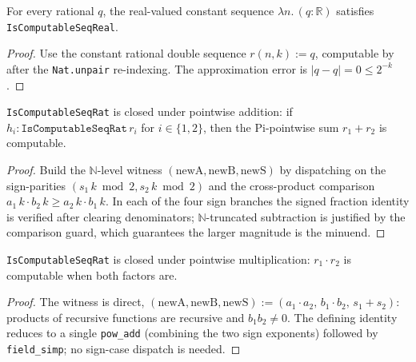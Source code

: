 \begin{lemma}
  \label{lem:l1_isComputableSeqReal_const_rat}
  \leanok
  For every rational $q$, the real-valued constant sequence $\lambda n.\,(q : \mathbb{R})$ satisfies \texttt{IsComputableSeqReal}.
\end{lemma}
\begin{proof}\leanok
  Use the constant rational double sequence $r(n,k) := q$, computable by  after the \texttt{Nat.unpair} re-indexing. The approximation error is $|q - q| = 0 \le 2^{-k}$.
\end{proof}

\begin{lemma}
  \label{lem:l1_isComputableSeqRat_add}
  \leanok
  \texttt{IsComputableSeqRat} is closed under pointwise addition: if $h_i : \texttt{IsComputableSeqRat}\,r_i$ for $i \in \{1,2\}$, then the Pi-pointwise sum $r_1 + r_2$ is computable.
\end{lemma}
\begin{proof}\leanok
  Build the $\mathbb{N}$-level witness $(\mathrm{newA}, \mathrm{newB}, \mathrm{newS})$ by dispatching on the sign-parities $(s_1\,k \bmod 2, s_2\,k \bmod 2)$ and the cross-product comparison $a_1\,k \cdot b_2\,k \ge a_2\,k \cdot b_1\,k$. In each of the four sign branches the signed fraction identity is verified after clearing denominators; $\mathbb{N}$-truncated subtraction is justified by the comparison guard, which guarantees the larger magnitude is the minuend.
\end{proof}

\begin{lemma}
  \label{lem:l1_isComputableSeqRat_mul}
  \leanok
  \texttt{IsComputableSeqRat} is closed under pointwise multiplication: $r_1 \cdot r_2$ is computable when both factors are.
\end{lemma}
\begin{proof}\leanok
  The witness is direct, $(\mathrm{newA}, \mathrm{newB}, \mathrm{newS}) := (a_1 \cdot a_2,\, b_1 \cdot b_2,\, s_1 + s_2)$: products of recursive functions are recursive and $b_1 b_2 \ne 0$. The defining identity reduces to a single \texttt{pow\_add} (combining the two sign exponents) followed by \texttt{field\_simp}; no sign-case dispatch is needed.
\end{proof}

